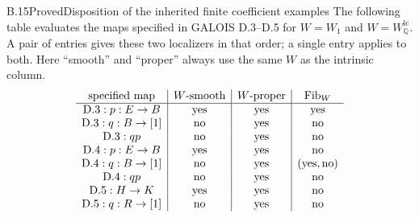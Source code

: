 \begin{claim}{B.15}{Proved}{Disposition of the inherited finite coefficient examples}
The following table evaluates the maps specified in GALOIS D.3--D.5 for
$W=W_1$ and $W=W_{\mathbb Q}^{\mathrm{lc}}$. A pair of entries gives
these two localizers in that order; a single entry applies to both.
Here ``smooth'' and ``proper'' always use the same $W$ as the intrinsic
column.
\[
\begin{array}{c|c|c|c}
\text{specified map}&W\text{-smooth}&W\text{-proper}&\mathrm{Fib}_W\\\hline
\mathrm{D.3}:p:E\to B&\text{yes}&\text{yes}&\text{yes}\\
\mathrm{D.3}:q:B\to[1]&\text{no}&\text{yes}&\text{no}\\
\mathrm{D.3}:qp&\text{no}&\text{yes}&\text{no}\\
\mathrm{D.4}:p:E\to B&\text{yes}&\text{yes}&\text{no}\\
\mathrm{D.4}:q:B\to[1]&\text{no}&\text{yes}&(\text{yes},\text{no})\\
\mathrm{D.4}:qp&\text{no}&\text{yes}&\text{no}\\
\mathrm{D.5}:H\to K&\text{yes}&\text{yes}&\text{no}\\
\mathrm{D.5}:q:R\to[1]&\text{no}&\text{yes}&\text{no}
\end{array}
\]
\end{claim}
